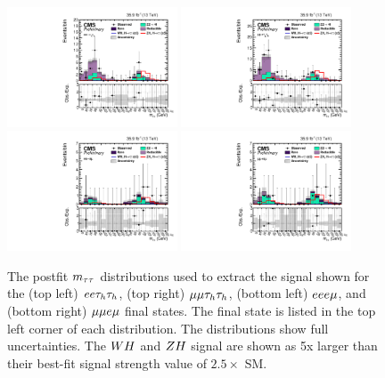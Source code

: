 \begin{figure}[h!]
 \begin{center}
  \includegraphics[width=0.45\textwidth]{higgs_to_taus_vh/plots/zh/eett_postfit.pdf}
  \includegraphics[width=0.45\textwidth]{higgs_to_taus_vh/plots/zh/mmtt_postfit.pdf}
  \includegraphics[width=0.45\textwidth]{higgs_to_taus_vh/plots/zh/eeem_postfit.pdf}
  \includegraphics[width=0.45\textwidth]{higgs_to_taus_vh/plots/zh/emmm_postfit.pdf}
 \end{center}
 \caption{The postfit $m_{\tau\tau}$ distributions used to extract the signal shown
  for the (top left) $ee\tau_{h}\tau_{h}$, (top right) $\mu\mu\tau_{h}\tau_{h}$, 
  (bottom left) $eee\mu$, and (bottom right) $\mu\mu e\mu$
  final states. The final state is listed in the
  top left corner of each distribution.
  The distributions show full uncertainties.
  The $WH$ and $ZH$ signal are shown as 5x larger than their best-fit
  signal strength value of $2.5 \times$ SM.
 }
 \label{fig:zh_all_eight2}
\end{figure}


